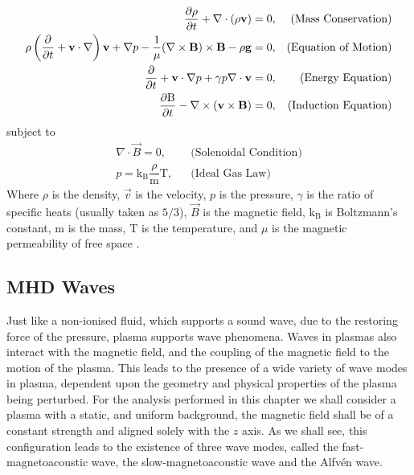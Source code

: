 \begin{align}                                                  
    \dfrac{\partial \rho }{\partial t} + \nabla \cdot (\rho \mathbf{v}) = 0,
    &&\text{(Mass Conservation)}\label{eq:imhd_mass}\\
    \rho  \left(\frac{\partial}{\partial t} + \mathbf{v}\cdot\nabla\right)\mathbf{v} + \nabla p - \dfrac{1}{\mu}(\nabla \times \mathbf{B}) \times \mathbf{B} - \rho \mathbf{g} = 0,
    &&\text{(Equation of Motion)}\label{eq:imhd_motion}\\
    \frac{\partial}{\partial t} + \mathbf{v}\cdot\nabla p + \gamma p \nabla \cdot \mathbf{v}  = 0,
    &&\text{(Energy Equation)}\label{eq:imhd_equation}\\
    \dfrac{\partial \mathrm{B}}{\partial t} - \nabla \times (\mathbf{v} \times \mathbf{B}) = 0,
    &&\text{(Induction Equation)}\label{eq:imhd_induction}
\end{align}
subject to
\begin{align}
    \nabla \cdot \vec{B} = 0,
    &&\text{(Solenoidal Condition)}\\
    p = \mathrm{k_B} \dfrac{\rho}{\mathrm{m}} \mathrm{T},
    &&\text{(Ideal Gas Law)}                    
\end{align}
Where $\rho$ is the density, $\vec{v}$ is the velocity, $p$ is the pressure, $\gamma$ is the ratio of specific heats (usually taken as $5/3$), $\vec{B}$ is the magnetic field, $\mathrm{k_B}$ is Boltzmann's constant, $\mathrm{m}$ is the mass, $\mathrm{T}$ is the temperature, and $\mu$ is the magnetic permeability of free space \citep{goedbloed2004}.


\subsection{MHD Waves}\label{sec:MHDwaves}
Just like a non-ionised fluid, which supports a sound wave, due to the restoring force of the pressure, plasma supports wave phenomena.
Waves in plasmas also interact with the magnetic field, and the coupling of the magnetic field to the motion of the plasma.
This leads to the presence of a wide variety of wave modes in plasma, dependent upon the geometry and physical properties of the plasma being perturbed.
For the analysis performed in this chapter we shall consider a plasma with a static, and uniform background, the magnetic field shall be of a constant strength and aligned solely with the $z$ axis.
As we shall see, this configuration leads to the existence of three wave modes, called the fast-magnetoacoustic wave, the slow-magnetoacoustic wave and the Alfv\'en wave.

